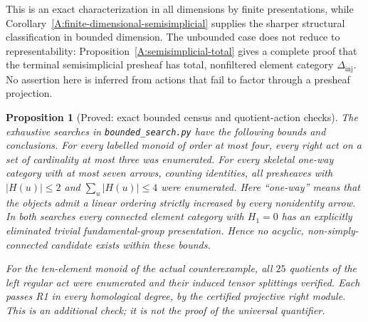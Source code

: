 \documentclass[11pt,a4paper]{article}
\newtheorem{proposition}[theorem]{Proposition}
\theoremstyle{definition}
\theoremstyle{remark}
\begin{document}
This is an exact characterization in all dimensions by finite presentations, while Corollary~\ref{A:finite-dimensional-semisimplicial} supplies the sharper structural classification in bounded dimension. The unbounded case does not reduce to representability: Proposition~\ref{A:semisimplicial-total} gives a complete proof that the terminal semisimplicial presheaf has total, nonfiltered element category $\Delta_{\mathrm{inj}}$. No assertion here is inferred from actions that fail to factor through a presheaf projection.

\begin{proposition}[Proved: exact bounded census and quotient-action checks]\label{A:census}
The exhaustive searches in \texttt{bounded\_search.py} have the following bounds and conclusions. For every labelled monoid of order at most four, every right act on a set of cardinality at most three was enumerated. For every skeletal one-way category with at most seven arrows, counting identities, all presheaves with $|H(u)|\leq2$ and $\sum_u|H(u)|\leq4$ were enumerated. Here ``one-way'' means that the objects admit a linear ordering strictly increased by every nonidentity arrow. In both searches every connected element category with $H_1=0$ has an explicitly eliminated trivial fundamental-group presentation. Hence no acyclic, non-simply-connected candidate exists within these bounds.

For the ten-element monoid of the actual counterexample, all $25$ quotients of the left regular act were enumerated and their induced tensor splittings verified. Each passes R1 in every homological degree, by the certified projective right module. This is an additional check; it is not the proof of the universal quantifier.
\end{proposition}
\end{document}
